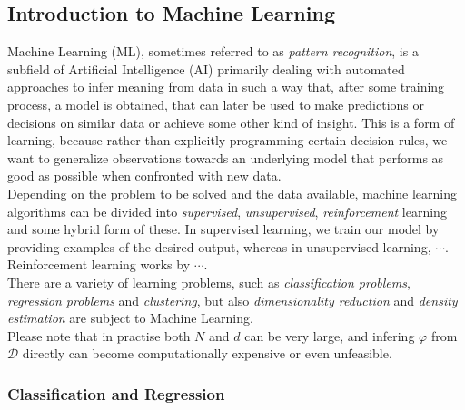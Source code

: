 \subsection{Introduction to Machine Learning}

Machine Learning (ML), sometimes referred to as \emph{pattern recognition}, is a subfield of Artificial Intelligence (AI) primarily dealing with automated approaches to infer meaning from data in such a way that, after some training process, a model is obtained, that can later be used to make predictions or decisions on similar data or achieve some other kind of insight. This is a form of learning, because rather than explicitly programming certain decision rules, we want to generalize observations towards an underlying model that performs as good as possible when confronted with new data.\\

Depending on the problem to be solved and the data available, machine learning algorithms can be divided into \emph{supervised}, \emph{unsupervised}, \emph{reinforcement} learning and some hybrid form of these. In supervised learning, we train our model by providing examples of the desired output, whereas in unsupervised learning, $\cdots$. \todo{} Reinforcement learning works by $\cdots$.\\

There are a variety of learning problems, such as \emph{classification problems}, \emph{regression problems} and \emph{clustering}, but also \emph{dimensionality reduction} and \emph{density estimation} are subject to Machine Learning.\\


Please note that in practise both $N$ and $d$ can be very large, and infering $\varphi$ from $\mathcal{D}$ directly can become computationally expensive or even unfeasible.

\subsubsection{Classification and Regression}

